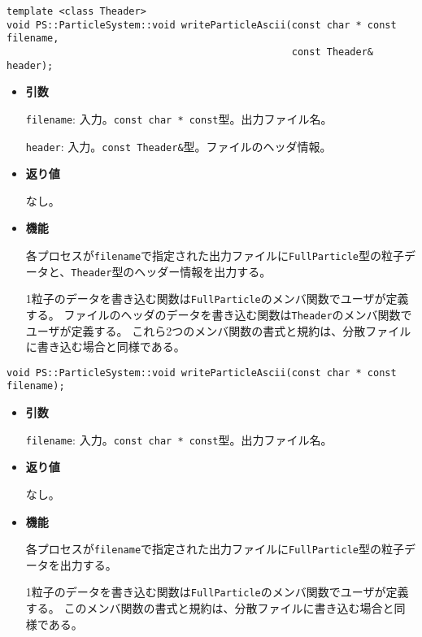 
\begin{screen}
\begin{verbatim}
template <class Theader>
void PS::ParticleSystem::void writeParticleAscii(const char * const filename,
                                                 const Theader& header);
\end{verbatim}
\end{screen}

\begin{itemize}

\item{{\bf 引数}}

{\tt filename}: 入力。{\tt const char * const}型。出力ファイル名。

{\tt header}: 入力。{\tt const Theader\&}型。ファイルのヘッダ情報。

\item{{\bf 返り値}}

なし。

\item{{\bf 機能}}

各プロセスが{\tt filename}で指定された出力ファイルに{\tt FullParticle}型の粒子データと、{\tt Theader}型のヘッダー情報を出力する。

1粒子のデータを書き込む関数は{\tt FullParticle}のメンバ関数でユーザが定義する。
ファイルのヘッダのデータを書き込む関数は{\tt Theader}のメンバ関数でユーザが定義する。
これら2つのメンバ関数の書式と規約は、分散ファイルに書き込む場合と同様である。

\end{itemize}


\begin{screen}
\begin{verbatim}
void PS::ParticleSystem::void writeParticleAscii(const char * const filename);
\end{verbatim}
\end{screen}

\begin{itemize}

\item{{\bf 引数}}

{\tt filename}: 入力。{\tt const char * const}型。出力ファイル名。

\item{{\bf 返り値}}

なし。

\item{{\bf 機能}}

各プロセスが{\tt filename}で指定された出力ファイルに{\tt FullParticle}型の粒子データを出力する。

1粒子のデータを書き込む関数は{\tt FullParticle}のメンバ関数でユーザが定義する。
このメンバ関数の書式と規約は、分散ファイルに書き込む場合と同様である。

\end{itemize}

